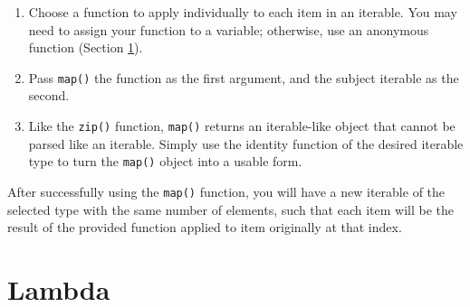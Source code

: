 \documentclass[12pt]{article}
\begin{document}
\begin{enumerate}
	\item{Choose a function to apply individually to each item in an iterable. You may need to assign your function to a variable; otherwise, use an anonymous function (Section \ref{lambda}).}
	\item{Pass \texttt{map()} the function as the first argument, and the subject iterable as the second.}
	\item{Like the \texttt{zip()} function, \texttt{map()} returns an iterable-like object that cannot be parsed like an iterable. Simply use the identity function of the desired iterable type to turn the \texttt{map()} object into a  usable form.}
\end{enumerate}

\noindent
After successfully using the \texttt{map()} function, you will have a new iterable of the selected type with the same number of elements, such that each item will be the result of the provided function applied to item originally at that index.


\newpage
\section{Lambda}
\label{lambda}
\end{document}
